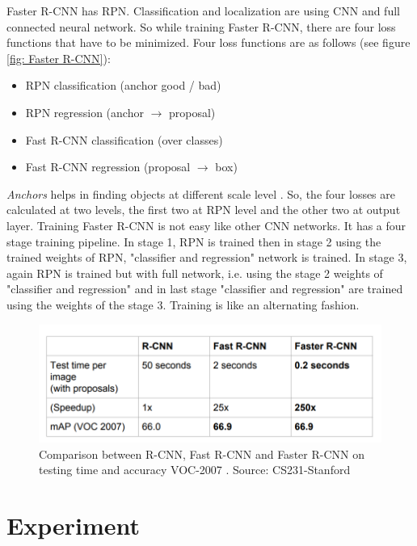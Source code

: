 \documentclass[twoside]{iitbreport}
\begin{document}
Faster R-CNN has RPN. Classification and localization are using CNN and full connected neural network. So while training Faster R-CNN, there are four loss functions that have to be minimized. Four loss functions are  as follows (see figure \ref{fig: Faster R-CNN}):
\begin{itemize}
  \item RPN classification (anchor good / bad)
  \item RPN regression (anchor 	$\rightarrow$ proposal)
  \item Fast R-CNN classification (over classes)
  \item Fast R-CNN regression (proposal $\rightarrow$ box)
\end{itemize}

\textit{Anchors} helps in finding objects at different scale level \cite{ren2015faster} . So, the four losses are calculated at two levels, the first two at RPN level and the other two at output layer. Training Faster R-CNN is not easy like other CNN networks. It has a four stage training  \cite{ren2015faster} pipeline. In stage 1, RPN is trained then in stage 2 using the trained weights of RPN, "classifier and regression" network is trained. In stage 3, again RPN is trained but with full network, i.e. using the stage 2 weights of "classifier and regression" and in last stage "classifier and regression" are trained using the weights of the stage 3. Training is like an alternating fashion.


\begin{figure}[H]
\includegraphics[width=0.85\linewidth]{campare-result-faster-rcnn.png}
\centering
\captionsetup{justification=centering}
\caption{Comparison between R-CNN, Fast R-CNN and Faster R-CNN on testing time and accuracy VOC-2007 \cite{ren2015faster} . Source: CS231-Stanford\protect\footnotemark}
\label{fig: Compare-Dection-Time-Result-fasterrcnn}
\end{figure}


\section{Experiment}
\end{document}
